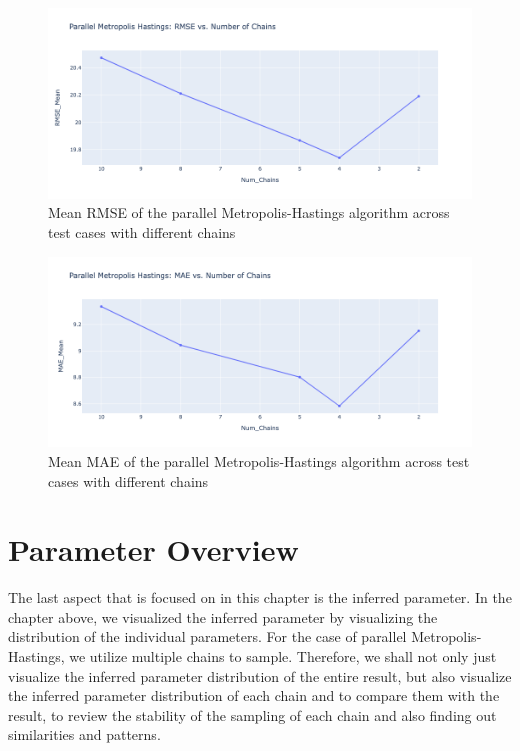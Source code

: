 \begin{figure}[H]
    \centering
    \includegraphics[width=1\textwidth]{figures/parallel_mh/rmse.png}
    \captionsetup{width=.8\textwidth}
    \caption{Mean RMSE of the parallel Metropolis-Hastings algorithm across test cases with different chains}
    \label{fig:enter-label}
\end{figure}

\begin{figure}[H]
    \centering
    \includegraphics[width=1\textwidth]{figures/parallel_mh/mae.png}
    \captionsetup{width=.8\textwidth}
    \caption{Mean MAE of the parallel Metropolis-Hastings algorithm across test cases with different chains}
    \label{fig:enter-label}
\end{figure}

\section{Parameter Overview}
The last aspect that is focused on in this chapter is the inferred parameter. In the chapter above, we visualized the inferred parameter by visualizing the distribution of the individual parameters. For the case of parallel Metropolis-Hastings, we utilize multiple chains to sample. Therefore, we shall not only just visualize the inferred parameter distribution of the entire result, but also visualize the inferred parameter distribution of each chain and to compare them with the result, to review the stability of the sampling of each chain and also finding out similarities and patterns.

